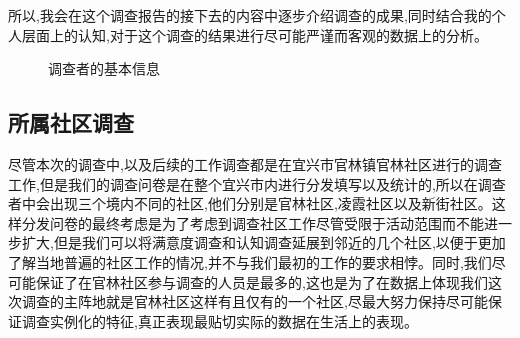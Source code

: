 \documentclass[AutoFakeBold]{LZUThesis}
\begin{document}
所以,我会在这个调查报告的接下去的内容中逐步介绍调查的成果,同时结合我的个人层面上的认知,对于这个调查的结果进行尽可能严谨而客观的数据上的分析。

\begin{figure}[!h]
	\centering
		\hspace{0 pt}
		\caption{调查者的基本信息}
\end{figure}

\subsection{所属社区调查}
尽管本次的调查中,以及后续的工作调查都是在宜兴市官林镇官林社区进行的调查工作,但是我们的调查问卷是在整个宜兴市内进行分发填写以及统计的,所以在调查者中会出现三个境内不同的社区,他们分别是官林社区,凌霞社区以及新街社区。这样分发问卷的最终考虑是为了考虑到调查社区工作尽管受限于活动范围而不能进一步扩大,但是我们可以将满意度调查和认知调查延展到邻近的几个社区,以便于更加了解当地普遍的社区工作的情况,并不与我们最初的工作的要求相悖。同时,我们尽可能保证了在官林社区参与调查的人员是最多的,这也是为了在数据上体现我们这次调查的主阵地就是官林社区这样有且仅有的一个社区,尽最大努力保持尽可能保证调查实例化的特征,真正表现最贴切实际的数据在生活上的表现。
\end{document}
